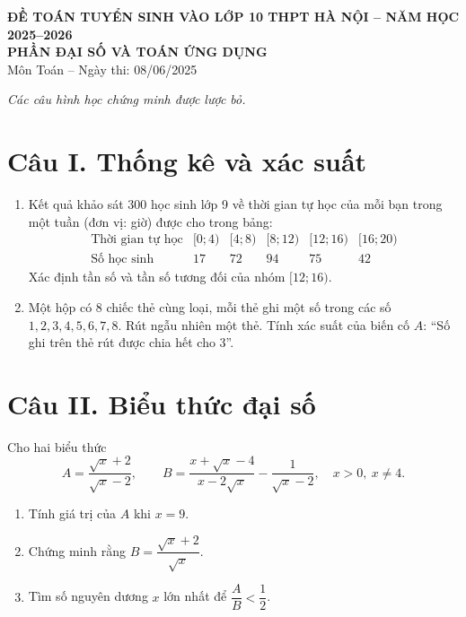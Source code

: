 \documentclass[12pt,a4paper]{article}
\begin{document}
\begin{center}
{\Large\bfseries ĐỀ TOÁN TUYỂN SINH VÀO LỚP 10 THPT HÀ NỘI -- NĂM HỌC 2025--2026}\\[2pt]
{\large\bfseries PHẦN ĐẠI SỐ VÀ TOÁN ỨNG DỤNG}\\
Môn Toán -- Ngày thi: 08/06/2025
\end{center}

\textit{Các câu hình học chứng minh được lược bỏ.}

\section*{Câu I. Thống kê và xác suất}
\begin{enumerate}
\item Kết quả khảo sát 300 học sinh lớp 9 về thời gian tự học của mỗi bạn trong một tuần (đơn vị: giờ) được cho trong bảng:
\[
\begin{array}{c|ccccc}
\text{Thời gian tự học} &[0;4)&[4;8)&[8;12)&[12;16)&[16;20)\\\hline
\text{Số học sinh}&17&72&94&75&42
\end{array}
\]
Xác định tần số và tần số tương đối của nhóm $[12;16)$.
\item Một hộp có 8 chiếc thẻ cùng loại, mỗi thẻ ghi một số trong các số $1,2,3,4,5,6,7,8$. Rút ngẫu nhiên một thẻ. Tính xác suất của biến cố $A$: ``Số ghi trên thẻ rút được chia hết cho 3''.
\end{enumerate}

\section*{Câu II. Biểu thức đại số}
Cho hai biểu thức
\[
A=\frac{\sqrt{x}+2}{\sqrt{x}-2},\qquad
B=\frac{x+\sqrt{x}-4}{x-2\sqrt{x}}-\frac{1}{\sqrt{x}-2},
\quad x>0,\ x\ne4.
\]
\begin{enumerate}
\item Tính giá trị của $A$ khi $x=9$.
\item Chứng minh rằng $B=\dfrac{\sqrt{x}+2}{\sqrt{x}}$.
\item Tìm số nguyên dương $x$ lớn nhất để $\dfrac AB<\dfrac12$.
\end{enumerate}
\end{document}
